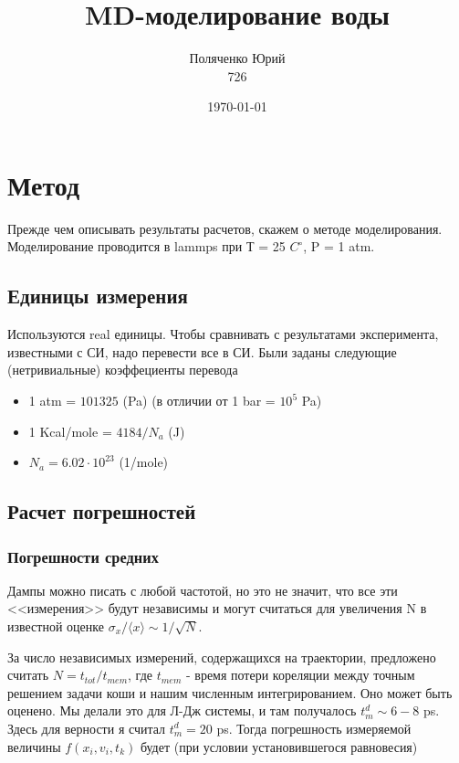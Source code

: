 \documentclass[a4paper,12pt]{article} %
\author{Поляченко Юрий \\ 726}
\title{MD-моделирование воды}
\date{\today}
\begin{document}

\clearpage\maketitle
\thispagestyle{empty}

\newpage

\section{Метод}

Прежде чем описывать результаты расчетов, скажем о методе моделирования. Моделирование проводится в lammps при Т = 25 $C^{\circ}$, P = 1 atm.

\subsection{Единицы измерения}

Используются real единицы. Чтобы сравнивать с результатами эксперимента, известными с СИ, надо перевести все в СИ. Были заданы следующие (нетривиальные) коэффециенты перевода

\begin{itemize}
\item 1 atm = $101325$ (Pa) (в отличии от 1 bar = $10^5$ Pa)
\item 1 Kcal/mole = $4184 / N_a$ (J)
\item $N_a = 6.02 \cdot 10^{23}$ (1/mole)
\end{itemize}

\subsection{Расчет погрешностей}

\subsubsection{Погрешности средних}

Дампы можно писать с любой частотой, но это не значит, что все эти <<измерения>> будут независимы и могут считаться для увеличения N в известной оценке $\sigma_x / \langle x \rangle \sim 1/\sqrt{N}$. 

За число независимых измерений, содержащихся на траектории, предложено считать $N = t_{tot} / t_{mem}$, где $t_{mem}$ - время потери кореляции между точным решением задачи коши и нашим численным интегрированием. Оно может быть оценено. Мы делали это для Л-Дж системы, и там получалось $t^d_m \sim 6-8$ ps. Здесь для верности я считал $t^d_m = 20$ ps. Тогда погрешность измеряемой величины $f(x_i, v_i, t_k)$ будет (при условии установившегося равновесия)
\end{document}
